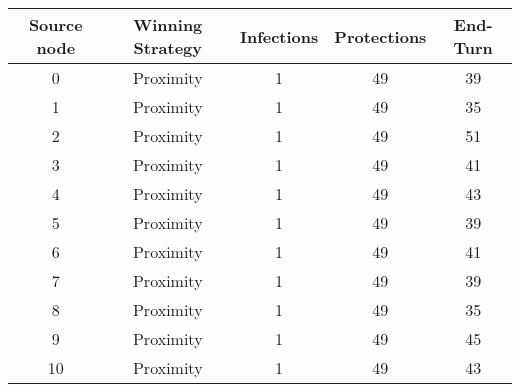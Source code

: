 \documentclass[results.tex]{subfiles}
\begin{document}
    \begin{center}
        \begin{tabular}{| c || c | c | c | c |}
            \hline
            {\bfseries Source node} & {\bfseries Winning Strategy} & {\bfseries Infections} & {\bfseries Protections}
            & {\bfseries End-Turn}
            \\  %
            \hline\hline
            0                       & Proximity                    & 1                      & 49                      & 39                   \\
            \hline
            1                       & Proximity                    & 1                      & 49                      & 35                   \\
            \hline
            2                       & Proximity                    & 1                      & 49                      & 51                   \\
            \hline
            3                       & Proximity                    & 1                      & 49                      & 41                   \\
            \hline
            4                       & Proximity                    & 1                      & 49                      & 43                   \\
            \hline
            5                       & Proximity                    & 1                      & 49                      & 39                   \\
            \hline
            6                       & Proximity                    & 1                      & 49                      & 41                   \\
            \hline
            7                       & Proximity                    & 1                      & 49                      & 39                   \\
            \hline
            8                       & Proximity                    & 1                      & 49                      & 35                   \\
            \hline
            9                       & Proximity                    & 1                      & 49                      & 45                   \\
            \hline
            10                      & Proximity                    & 1                      & 49                      & 43                   \\

\end{tabular}
\end{center}
\end{document}
